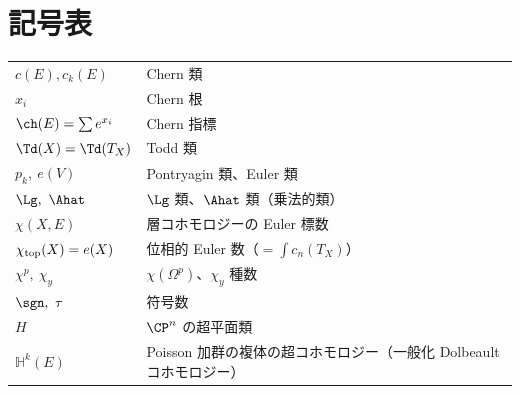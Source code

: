 \section*{記号表}
\begin{tabular}{lp{9.5cm}}
$c(E),c_k(E)$ & Chern 類\\
$x_i$ & Chern 根\\
$\ch(E)=\sum e^{x_i}$ & Chern 指標\\
$\Td(X)=\Td(T_X)$ & Todd 類\\
$p_k,\ e(V)$ & Pontryagin 類、Euler 類\\
$\Lg,\ \Ahat$ & $\Lg$ 類、$\Ahat$ 類（乗法的類）\\
$\chi(X,E)$ & 層コホモロジーの Euler 標数\\
$\chi_{\rm top}(X)=e(X)$ & 位相的 Euler 数（$=\int c_n(T_X)$）\\
$\chi^p,\ \chi_y$ & $\chi(\Omega^p)$、$\chi_y$ 種数\\
$\sgn,\ \tau$ & 符号数\\
$H$ & $\CP^n$ の超平面類\\
$\mathbb H^k(E)$ & Poisson 加群の複体の超コホモロジー（一般化 Dolbeault コホモロジー）\\
\end{tabular}

